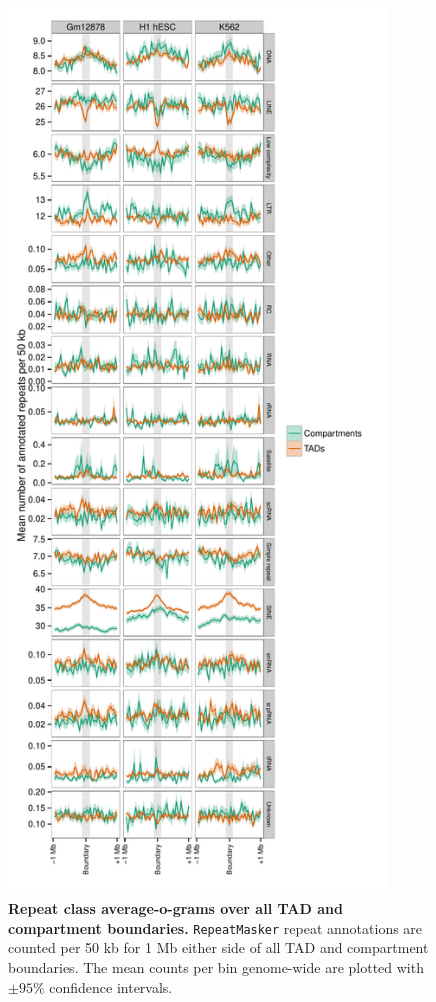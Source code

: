 \documentclass[a4paper,11pt,oneside]{book}
\begin{document}
\begin{figure}
\begin{center} 
\includegraphics[width=3.95in]{rep_classprofiles.pdf}
\captionsetup{width=\textwidth}
\caption[Repeat class average-o-grams over all TAD and compartment boundaries.]{ {\bf Repeat class average-o-grams over all TAD and compartment boundaries.}
\texttt{RepeatMasker} repeat annotations are counted per 50 kb for 1 Mb either side of all TAD and compartment boundaries. The mean counts per bin genome-wide are plotted with $\pm 95\%$ confidence intervals.
}\label{fig:rep_classprofiles}
\end{center}
\end{figure} 
\end{document}
